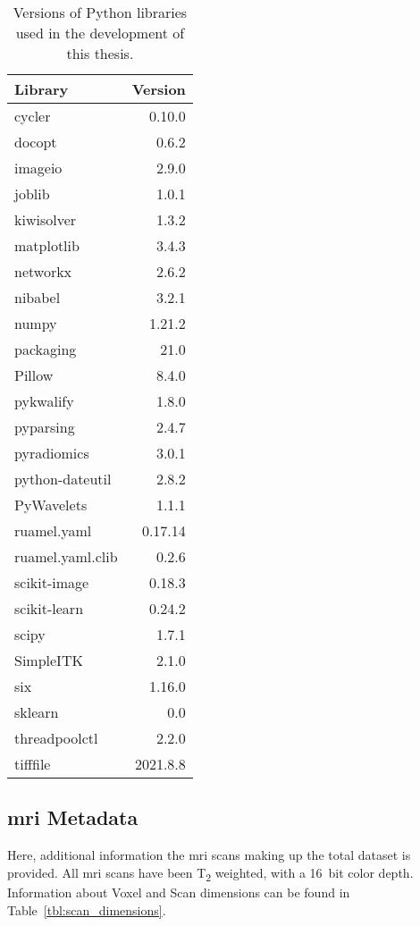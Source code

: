 \begin{table}[H]
  \begin{tabularx}{\textwidth}{X r}
    Library & Version \\\hline
    cycler & 0.10.0 \\
    docopt & 0.6.2 \\
    imageio & 2.9.0 \\
    joblib & 1.0.1 \\
    kiwisolver & 1.3.2 \\
    matplotlib & 3.4.3 \\
    networkx & 2.6.2 \\
    nibabel & 3.2.1 \\
    numpy & 1.21.2 \\
    packaging & 21.0 \\
    Pillow & 8.4.0 \\
    pykwalify & 1.8.0 \\
    pyparsing & 2.4.7 \\
    pyradiomics & 3.0.1 \\
    python-dateutil & 2.8.2 \\
    PyWavelets & 1.1.1 \\
    ruamel.yaml & 0.17.14 \\
    ruamel.yaml.clib & 0.2.6 \\
    scikit-image & 0.18.3 \\
    scikit-learn & 0.24.2 \\
    scipy & 1.7.1 \\
    SimpleITK & 2.1.0 \\
    six & 1.16.0 \\
    sklearn & 0.0 \\
    threadpoolctl & 2.2.0 \\
    tifffile & 2021.8.8 \\
  \end{tabularx}
  \caption{Versions of Python libraries used in the development of this thesis.}\label{tbl:library_versions}
\end{table}

\subsection{\acs{mri} Metadata}\label{sec:mri_metadata}

Here, additional information the \ac{mri} scans making up the total dataset
is provided. All \ac{mri} scans have been T\textsubscript{2} weighted, with a
\SI[minimum-decimal-digits=0,drop-zero-decimal]{16}{bit} color depth. Information about Voxel and Scan dimensions can be 
found in Table~\ref{tbl:scan_dimensions}.

